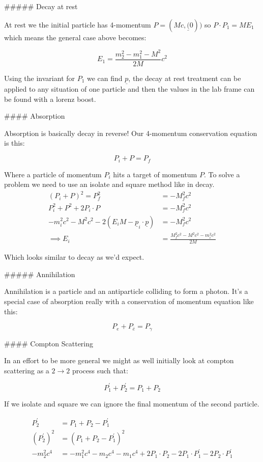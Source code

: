 ##### Decay at rest

At rest we the initial particle has 4-momentum $P=(Mc, \underline(0))$ so $P\cdot P_1 = ME_1$ which means the general case above becomes:

$$
E_1 = \frac{m_2^2 - m_1^2 - M^2}{2M}c^2
$$

Using the invariant for $P_1$ we can find $\underline{p}$, the decay at rest treatment can be applied to any situation of one particle and then the values in the lab frame can be found with a lorenz boost.

#### Absorption

Absorption is basically decay in reverse! Our 4-momentum conservation equation is this:

$$
P_i + P = P_f
$$

Where a particle of momentum $P_i$ hits a target of momentum $P$. To solve a problem we need to use an isolate and square method like in decay.
$$
\begin{aligned} 
(P_i + P)^2 = P_f^2 &= -M_f^2c^2\\
P_i^2 + P^2 + 2P_i\cdot P &= -M_f^2c^2\\
-m_i^2c^2 - M^2c^2 - 2(E_iM - \underline{p}_i\cdot\underline{p}) &= -M_f^2c^2\\
\implies E_i &= \frac{M_f^2c^2 - M^2c^2 - m_i^2c^2}{2M}
\end{aligned}
$$

Which looks similar to decay as we'd expect.

##### Annihilation

Annihilation is a particle and an antiparticle colliding to form a photon. It's a special case of absorption really with a conservation of momentum equation like this:

$$
P_e + P_{\bar{e}} = P_\gamma
$$

#### Compton Scattering

In an effort to be more general we might as well initially look at compton scattering as a $2 \rightarrow 2$ process such that:

$$
P^\prime_1 + P^\prime_2 = P_1 + P_2
$$

If we isolate and square we can ignore the final momentum of the second particle.

$$
\begin{aligned}
    P^\prime_2 &= P_1 + P_2 - P^\prime_1\\
    (P^\prime_2)^2 &= (P_1 + P_2 - P^\prime_1)^2\\
    -m_2^2c^4 &= -m_1^2c^4 - m_2c^4 - m_1c^4 + 2P_1\cdot P_2 - 2P_1\cdot P^\prime_1 - 2P_2\cdot P^\prime_1
\end{aligned}
$$

